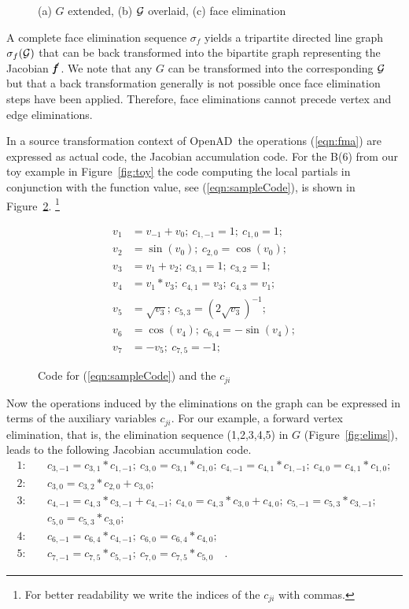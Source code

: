 \documentclass[acmtocl,acmnow]{acmtrans2m}
\newcommand{\OpenAD}{OpenAD}
\newcommand{\bmf}{\mbox{\bf\em f}}
\newcommand{\reffig}[1]{Figure~\ref{#1}}
\newcommand{\refeqn}[1]{(\ref{#1})}
\begin{document}
\begin{figure}
\centering
{}
\caption{
(a) $G$ extended, 
(b) $\cal G$ overlaid, 
(c) face elimination 
}
\label{fig:face_elims}
\end{figure}
A complete face elimination sequence $\sigma_f$ yields a tripartite 
directed line graph $\sigma_f({\cal G})$ that can be back transformed into 
the bipartite graph representing the Jacobian $\bmf'$.
We note that any $G$ can be transformed into the 
corresponding $\cal G$ but that a back transformation 
generally is not  possible once face elimination steps have been applied. 
Therefore, face eliminations cannot precede vertex and edge 
eliminations.

In a source transformation context of \OpenAD\ the operations \refeqn{eqn:fma} are 
expressed as actual code, the Jacobian accumulation code. For the 
B(6) from our toy example in \reffig{fig:toy} the code computing 
the local partials in conjunction with the function value, see \refeqn{eqn:sampleCode}, 
is shown in 
\reffig{fig:toyAndPartials}.
\footnote{
For better readability we write the indices of the $c_{ji}$ with commas.
} 
\begin{figure}
\begin{minipage}{\linewidth}
\begin{align*}
 v_1&=v_{-1}+v_0;~c_{1,-1}=1;~c_{1,0}=1; \\
 v_2&=\sin(v_0);~c_{2,0}=\cos(v_0); \\
 v_3&=v_1+v_2;~c_{3,1}=1;~c_{3,2}=1; \\
 v_4&=v_1*v_3;~c_{4,1}=v_3;~c_{4,3}=v_1; \\
 v_5&=\sqrt{v_3};~c_{5,3}=(2\sqrt{v_3})^{-1}; \\
 v_6&=\cos(v_4);~c_{6,4}=-\sin(v_4); \\
 v_7&=-v_5;~c_{7,5}=-1;
\end{align*}
\end{minipage}
\caption{Code for \refeqn{eqn:sampleCode} and the $c_{ji}$}\label{fig:toyAndPartials}
\end{figure}
Now the operations induced by the eliminations on the graph can 
be expressed in terms of the auxiliary variables $c_{ji}$.
For our example, a forward vertex elimination, that is, the elimination
sequence (1,2,3,4,5) in $G$ (\reffig{fig:elims}), leads to the
following Jacobian accumulation code.
{
\begin{align*}
1:\quad  &c_{3,-1}=c_{3,1} * c_{1,-1};~c_{3,0}=c_{3,1} * c_{1,0};~c_{4,-1}=c_{4,1} * c_{1,-1};~c_{4,0}=c_{4,1} * c_{1,0}; \\
2:\quad  &c_{3,0}=c_{3,2} * c_{2,0}+c_{3,0}; \\
3:\quad  &c_{4,-1}=c_{4,3} * c_{3,-1}+c_{4,-1};~c_{4,0}=c_{4,3} * c_{3,0}+c_{4,0};~c_{5,-1}=c_{5,3} * c_{3,-1}; \\
&c_{5,0}=c_{5,3} * c_{3,0}; \\
4:\quad  &c_{6,-1}=c_{6,4} * c_{4,-1};~c_{6,0}=c_{6,4} * c_{4,0}; \\
5:\quad  &c_{7,-1}=c_{7,5} * c_{5,-1};~c_{7,0}=c_{7,5} * c_{5,0} \quad .
\end{align*}
}
\end{document}
